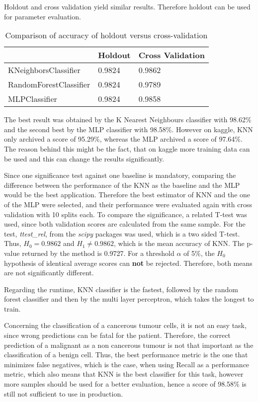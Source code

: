 Holdout and cross validation yield similar results.
Therefore holdout can be used for parameter evaluation.

\begin{table}[H]
\begin{center}
\begin{tabular}{|l|l|l|}
\hline
                       & Holdout & Cross Validation \\ \hline
KNeighborsClassifier   & 0.9824  & 0.9862           \\ \hline
RandomForestClassifier & 0.9824  & 0.9789           \\ \hline
MLPClassifier          & 0.9824  & 0.9858           \\ \hline
\end{tabular}
\caption{Comparison of accuracy of holdout versus cross-validation}
\end{center}
\end{table}

The best result was obtained by the K Nearest Neighbours classifier with 98.62\% and the second best by the MLP classifier with 98.58\%. However on kaggle, KNN only archived a score of 95.29\%, whereas the MLP archived a score of 97.64\%. The reason behind this might be the fact, that on kaggle more training data can be used and this can change the results significantly.

Since one significance test against one baseline is mandatory, comparing the difference between the performance of the KNN as the baseline and the MLP would be the best application. Therefore the best estimator of KNN and the one of the MLP were selected, and their performance were evaluated again with cross validation with 10 splits each. To compare the significance, a related T-test was used, since both validation scores are calculated from the same sample. For the test, \textit{ttest\_rel}, from the \textit{scipy} packages was used, which is a two sided T-test. Thus, $H_0=0.9862$ and $H_1\neq0.9862$, which is the mean accuracy of KNN. The p-value returned by the method is 0.9727. For a threshold $\alpha$ of 5\%, the $H_0$ hypothesis of identical average scores can \textbf{not} be rejected. Therefore, both means are not significantly different.


Regarding the runtime, KNN classifier is the fastest, followed by the random forest classifier and then by the multi layer perceptron, which takes the longest to train.

Concerning the classification of a cancerous tumour cells, it is not an easy task, since wrong predictions can be fatal for the patient. Therefore, the correct prediction of a malignant as a non cancerous tumour is not that important as the classification of a benign cell. Thus, the best performance metric is the one that minimizes false negatives, which is the case, when using Recall as a performance metric, which also means that KNN is the best classifier for this task, however more samples should be used for a better evaluation, hence a score of 98.58\% is still not sufficient to use in production.

